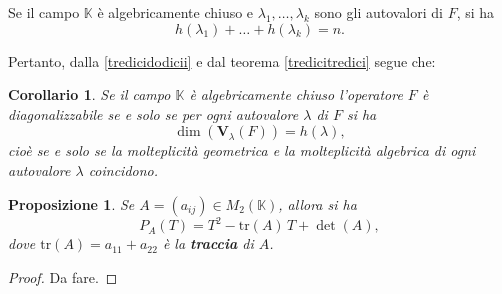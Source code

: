 \documentclass{article}
\theoremstyle{plain}
\newtheorem{prop}[thm]{Proposizione}
\newtheorem{cor}{Corollario}
\theoremstyle{definition}
\theoremstyle{remark}
\begin{document}
\vspace{10pt}

Se il campo $\mathbb{K}$ è algebricamente chiuso e $\lambda_1, \dots, \lambda_k$ sono gli autovalori di $F$, si ha
\[
h(\lambda_1) + \dots + h(\lambda_k) = n.
\]

\vspace{10pt}

Pertanto, dalla \ref{tredicidodicii} e dal teorema \ref{tredicitredici} segue che:

\vspace{10pt}

\begin{bxthm}
\begin{cor}
Se il campo $\mathbb{K}$ è algebricamente chiuso l'operatore $F$ è diagonalizzabile se e solo se per ogni autovalore $\lambda$ di $F$ si ha
\[
\dim(\mathbf{V}_\lambda(F)) = h(\lambda),
\]
cioè se e solo se la molteplicità geometrica e la molteplicità algebrica di ogni autovalore $\lambda$ coincidono.    
\end{cor}    
\end{bxthm}

\vspace{10pt}

\begin{bxthm}
\begin{prop}
Se $A = (a_{ij}) \in M_2(\mathbb{K})$, allora si ha
\[
P_A(T) = T^2 - \mathrm{tr}(A)\, T + \det(A),
\]
dove $\mathrm{tr}(A) = a_{11} + a_{22}$ è la \textbf{traccia} di $A$.    
\end{prop}
\end{bxthm}
\begin{proof}
    Da fare.
\end{proof}

\vspace{10pt}
\end{document}
